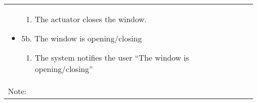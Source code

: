 \documentclass{article}
\begin{document}
\begin{table}[h!]
\begin{center}
\begin{tabular}{l|l}
\begin{minipage}{3in}
\begin{itemize}
\begin{enumerate}
							\item The actuator closes the window.
							
							
						\end{enumerate}
						\item[] 5b. The window is opening/closing
						\begin{enumerate}
							
							\item The system notifies the user “The window is opening/closing”
							
						\end{enumerate}
					\end{itemize}
					\vskip 2pt
				\end{minipage}\\
				Note: & \\
				\hline
			\end{tabular}
		\end{center}
	\end{table}
\end{document}

